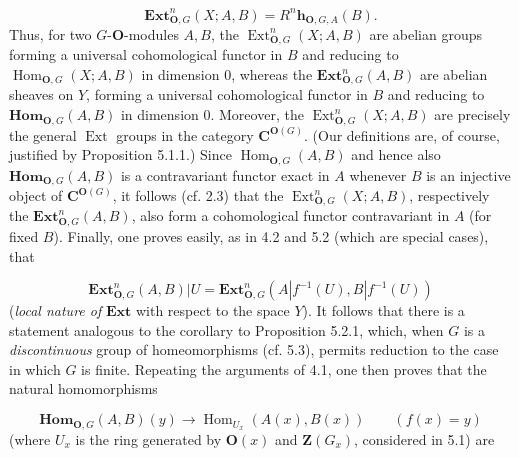 \[
\tag{5.6.7}
\mathbf{Ext}_{{\mathbf O},G}^n(X;A,B)=R^n\mathbf h_{{\mathbf O},G,A}(B).
\]
Thus, for two $G$-${\mathbf O}$-modules $A,B$, the
$\operatorname{Ext}_{{\mathbf O},G}^n(X;A,B)$ are abelian groups forming a universal
cohomological functor in $B$ and reducing to
$\operatorname{Hom}_{{\mathbf O},G}(X;A,B)$ in dimension 0, whereas the
$\mathbf{Ext}_{{\mathbf O},G}^n(A,B)$ are abelian sheaves on $Y$, forming a universal
cohomological functor in $B$ and reducing to $\mathbf{Hom}_{{\mathbf O},G}(A,B)$ in
dimension 0. Moreover, the $\operatorname{Ext}_{{\mathbf O},G}^n(X;A,B)$ are precisely
the general $\operatorname{Ext}$ groups in the category ${\mathbf C}^{{\mathbf O}(G)}$. (Our
definitions are, of course, justified by Proposition 5.1.1.) Since
$\operatorname{Hom}_{{\mathbf O},G}(A,B)$ and hence also
$\mathbf{Hom}_{{\mathbf O},G}(A,B)$ is a contravariant functor exact in $A$ whenever
$B$ is an injective object of ${\mathbf C}^{{\mathbf O}(G)}$, it follows (cf. 2.3) that the
$\operatorname{Ext}_{{\mathbf O},G}^n(X;A,B)$, respectively the
$\mathbf{Ext}_{{\mathbf O},G}^n(A,B)$, also form a cohomological functor contravariant
in $A$ (for fixed $B$). Finally, one proves easily, as in 4.2 and 5.2 (which
are special cases), that

\[
\tag{5.6.8}
\mathbf{Ext}_{{\mathbf O},G}^n(A,B)|U
=\mathbf{Ext}_{{\mathbf O},G}^n(A|f^{-1}(U),B|f^{-1}(U))
\]
 (\textit{local nature of} $\mathbf{Ext}$ with respect to
the space $Y$). It follows that there is a statement analogous to the
corollary to Proposition 5.2.1, which, when $G$ is a \textit{discontinuous}
group of homeomorphisms (cf. 5.3), permits reduction to the case in which $G$
is finite. Repeating the arguments of 4.1, one then proves that the natural
homomorphisms

\[
\tag{5.6.9}
\mathbf{Hom}_{{\mathbf O},G}(A,B)(y)
\to \operatorname{Hom}_{U_x}(A(x),B(x))
\qquad (f(x)=y)
\]
 (where $U_x$ is the ring generated by ${\mathbf O}(x)$ and ${\mathbf Z}(G_x)$, considered
in 5.1) are

